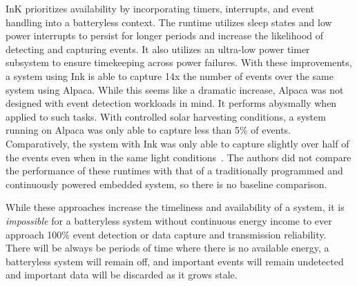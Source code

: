 InK prioritizes availability by incorporating timers, interrupts, and event handling into a batteryless context.
The runtime utilizes sleep states and low power interrupts to persist for longer periods and increase the likelihood of detecting and capturing events. It also utilizes an ultra-low power timer subsystem to ensure timekeeping across power failures.
With these improvements, a system using Ink is able to capture 14x the number of events over the same system using Alpaca.
While this seems like a dramatic increase, Alpaca was not designed with event detection workloads in mind. It performs abysmally
when applied to such tasks. With controlled solar harvesting conditions, a system running on Alpaca was only able to capture less than 5\% of events.
Comparatively, the system with Ink was only able to capture slightly over half of the events even when in the same light conditions~\cite{yildirim2018ink}. The authors did not compare the performance of these runtimes with that of a traditionally programmed and continuously powered embedded system, so there is no baseline comparison.

While these approaches increase the timeliness and availability of a system,
it is \textit{impossible} for a batteryless system without continuous energy income to ever approach 100\% event detection or data capture and transmission reliability.
There will be always be periods of time where there is no available energy, a batteryless system will remain off, and important events will remain undetected and important data will be discarded as it grows stale.


